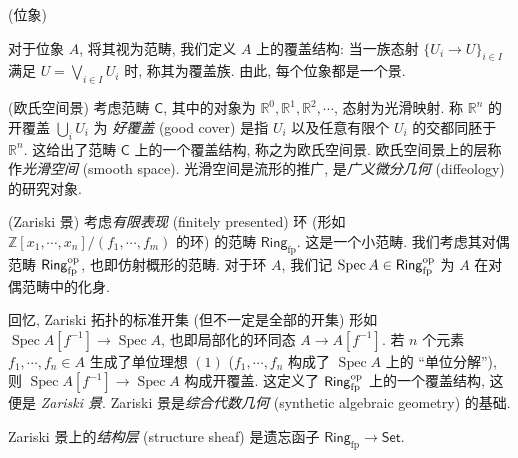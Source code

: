 \begin{example}
	[label={locale-as-site}]
    {(位象)}
    
    对于位象 $A$, 将其视为范畴, 我们定义 $A$ 上的覆盖结构:
    当一族态射 $\{U_i \to U\}_{i\in I}$ 满足 $U = \bigvee_{i\in I} U_i$ 时, 称其为覆盖族.
    由此, 每个位象都是一个景.
\end{example}

\begin{example}
    [label={cartsp-site}]
    {(欧氏空间景)}
    考虑范畴 $\mathsf C$, 其中的对象为 $\mathbb{R}^0,\mathbb{R}^1,\mathbb{R}^2,\cdots$,
    态射为光滑映射.
    称 $\mathbb{R}^n$ 的开覆盖 $\bigcup_i U_i$ 为 \emph{好覆盖} (good cover) 是指 $U_i$ 以及任意有限个 $U_i$ 的交都同胚于 $\mathbb{R}^n$.
    这给出了范畴 $\mathsf C$ 上的一个覆盖结构, 称之为欧氏空间景.
    欧氏空间景上的层称作\emph{光滑空间} (smooth space).
    光滑空间是流形的推广, 是\emph{广义微分几何} (diffeology) 的研究对象.
\end{example}

\begin{example}
    [label={zariski-site}]
    {(Zariski 景)}
    考虑\emph{有限表现} (finitely presented) 环 (形如 $\mathbb{Z}[x_1,\cdots,x_n]/(f_1,\cdots,f_m)$ 的环) 的范畴 $\mathsf {Ring}_{\text{fp}}$. 这是一个小范畴\footnotemark.
    我们考虑其对偶范畴 $\mathsf {Ring}_{\text{fp}}^{\text{op}}$, 也即仿射概形的范畴.
    对于环 $A$, 我们记 $\operatorname{Spec} A \in \mathsf {Ring}_{\text{fp}}^{\text{op}}$ 为 $A$ 在对偶范畴中的化身.

    回忆, Zariski 拓扑的标准开集 (但不一定是全部的开集) 形如 $\operatorname{Spec} A[f^{-1}] \to \operatorname{Spec}A$, 也即局部化的环同态 $A \to A[f^{-1}]$. 若 $n$ 个元素 $f_1,\cdots,f_n \in A$ 生成了单位理想 $(1)$ ($f_1,\cdots,f_n$ 构成了 $\operatorname{Spec}A$ 上的 ``单位分解''),
    则 $\operatorname{Spec}A[f^{-1}] \to \operatorname{Spec}A$ 构成开覆盖. 这定义了 $\mathsf {Ring}_{\text{fp}}^{\text{op}}$ 上的一个覆盖结构, 这便是 \emph{Zariski 景}.
    Zariski 景是\emph{综合代数几何} (synthetic algebraic geometry) 的基础.

    Zariski 景上的\emph{结构层} (structure sheaf) 是遗忘函子 $\mathsf{Ring}_{\text{fp}} \to \mathsf{Set}$.
\end{example}

